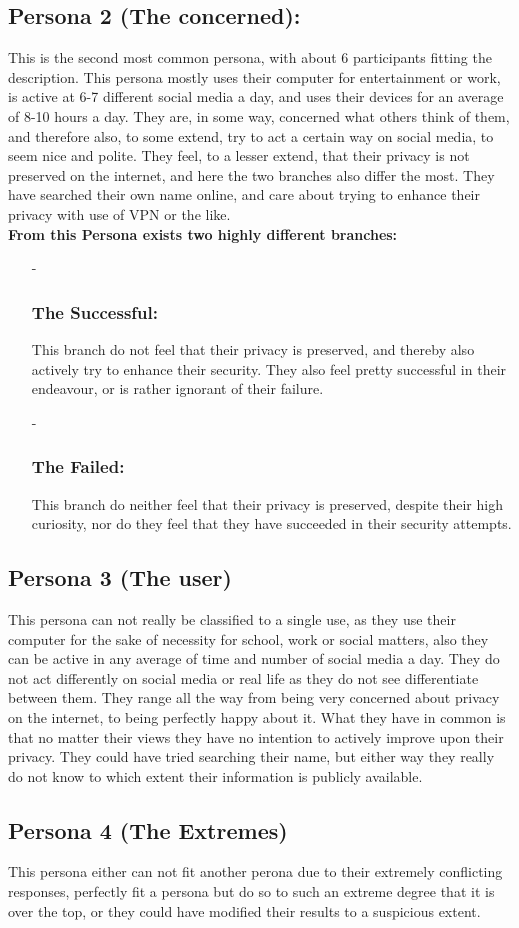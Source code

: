 \subsection{Persona 2 (The concerned):}\label{persona2}
This is the second most common persona, with about 6 participants fitting the description.
This persona mostly uses their computer for entertainment or work, is active at 6-7 different social media a day,
and uses their devices for an average of 8-10 hours a day.
They are, in some way, concerned what others think of them, and therefore also, to some extend, try to act a certain way on social media, to seem nice and polite.
They feel, to a lesser extend, that their privacy is not preserved on the internet, and here the two branches also differ the most.
They have searched their own name online, and care about trying to enhance their privacy with use of VPN or the like.\\

\noindent\textbf{From this Persona exists two highly different branches:}
\begin{itemize}
    \item[-] \subsubsection{The Successful:}\label{persona21}
    This branch do not feel that their privacy is preserved, and thereby also actively try to enhance their security. They also feel pretty successful in their endeavour, or is rather ignorant of their failure.
    \item[-] \subsubsection{The Failed:}\label{persona22}
    This branch do neither feel that their privacy is preserved, despite their high curiosity, nor do they feel that they have succeeded in their security attempts.
\end{itemize}

\subsection{Persona 3 (The user)}\label{persona3}
This persona can not really be classified to a single use, as they use their computer for the sake of necessity for school, work or social matters, also they can be active in any average of time and number of social media a day.
They do not act differently on social media or real life as they do not see differentiate between them.
They range all the way from being very concerned about privacy on the internet, to being perfectly happy about it. What they have in common is that no matter their views they have no intention to actively improve upon their privacy.  
They could have tried searching their name, but either way they really do not know to which extent their information is publicly available.

\subsection{Persona 4 (The Extremes)}\label{persona4}
This persona either can not fit another perona due to their extremely conflicting responses, perfectly fit a persona but do so to such an extreme degree that it is over the top, or they could have modified their results to a suspicious extent.